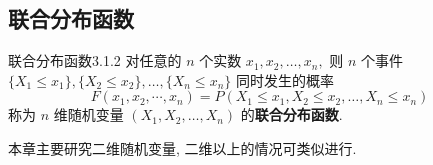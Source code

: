   \subsection{联合分布函数}\label{ssec:3.1.2}
  \begin{definition}{联合分布函数}{3.1.2}
  	对任意的 $n$ 个实数 $x_1,x_2,\ldots,x_n ,$ 则 $n$ 个事件 $\{X_1\leq x_1\},\{X_2 \leq x_2\},\ldots,\{X_n\leq x_n\}$ 同时发生的概率
    \begin{equation}
    	F\left(x_{1}, x_{2}, \cdots, x_{n}\right)=P\left(X_{1} \leq x_{1}, X_{2} \leq x_{2}, \ldots, X_{n} \leq x_{n}\right)\label{eq:3.1.1}
    \end{equation}
	称为 $n$ 维随机变量 $(X_1,X_2,\ldots,X_n)$ 的\textbf{联合分布函数}.
  \end{definition}
   本章主要研究二维随机变量, 二维以上的情况可类似进行.

